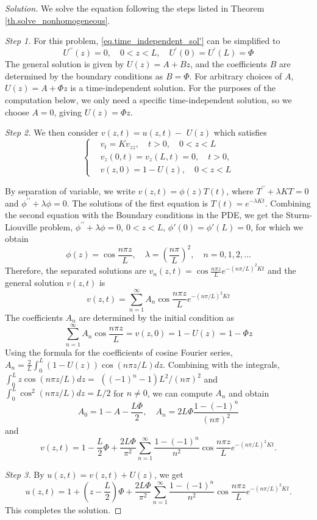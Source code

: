 \begin{proof}[Solution] We solve the equation following the steps listed in Theorem \ref{th.solve_nonhomogeneous}.

\textit{Step 1.} For this problem, \eqref{eq.time_independent_sol'} can be simplified to 
$$
U^{\prime \prime}(z)=0, \quad 0<z<L, \quad U^{\prime}(0)=U^{\prime}(L)=\Phi
$$
The general solution is given by $U(z)=A+Bz$, and the coefficients $B$ are determined by the boundary conditions as $B=\Phi$. For arbitrary choices of $A$, $U(z)=A+\Phi z$ is a time-independent solution. For the purposes of the computation below, we only need a specific time-independent solution, so we choose $A = 0$, giving $U(z)=\Phi z$.

\textit{Step 2.} We then consider $v(z, t)=u(z, t)-$ $U(z)$ which satisfies
$$
    \left\{\begin{aligned}
        & v_t=K v_{z z}, \quad t>0, \quad 0<z<L 
        \\
        &v_z(0, t)=v_z(L, t)=0, \quad t>0, 
        \\
        &v(z, 0)=1-U(z), \quad 0<z<L
        \end{aligned}\right.
    $$

By separation of variable, we write $v(z, t)=\phi(z) T(t)$, where $T^{\prime \prime}+\lambda K T=0$ and $\phi^{\prime \prime}+\lambda \phi=0$. The solutions of the first equation is $T(t)=e^{-\lambda K t}$. Combining the second equation with the Boundary conditions in the PDE, we get the Sturm-Liouville problem, $\phi^{\prime \prime}+\lambda \phi=0$, $0<z<L$, $\phi'(0)=\phi'(L)=0$, for which we obtain
    $$
    \phi(z)=\cos \frac{n \pi z}{L}, \quad \lambda=\left(\frac{n \pi}{L}\right)^2, \quad n=0,1,2, \ldots
    $$
Therefore, the separated solutions are $v_n(z, t)=\cos \frac{n \pi z}{L} e^{-(n \pi / L)^2 K t}$ and the general solution $v(z, t)$ is
    $$
    v(z, t)=\sum_{n=1}^{\infty} A_n \cos \frac{n \pi z}{L} e^{-(n \pi / L)^2 K t}
    $$
The coefficients $A_n$ are determined by the initial condition as    
    $$
    \sum_{n=1}^{\infty} A_n \cos \frac{n \pi z}{L} = v(z, 0)=1-U(z)=1-\Phi z
    $$
    Using the formula for the coefficients of cosine Fourier series, $A_n = \frac{2}{L}\int_0^L (1-U(z))\cos (n \pi z / L) d z$. Combining with the integrals, $\int_0^L z \cos (n \pi z / L) d z=$ $\left((-1)^n-1\right) L^2 /(n \pi)^2$ and $ \int_0^L \cos ^2(n \pi z / L) d z=L / 2$ for $n \neq 0$, we can compute $A_n$ and obtain
    $$
    A_0=1-A-\frac{L \Phi}{2}, \quad A_n=2 L \Phi \frac{1-(-1)^n}{(n \pi)^2}
    $$
and
    $$
    v(z, t)=1-\frac{L}{2}\Phi+\frac{2 L \Phi}{\pi^2} \sum_{n=1}^{\infty} \frac{1-(-1)^n}{n^2} \cos \frac{n \pi z}{L} e^{-(n \pi / L)^2 K t}.
    $$


\textit{Step 3.} By $u(z, t) = v(z, t) + U(z)$, we get
    $$
    u(z, t)=1+\left(z-\frac{L}{2}\right) \Phi+\frac{2 L \Phi}{\pi^2} \sum_{n=1}^{\infty} \frac{1-(-1)^n}{n^2} \cos \frac{n \pi z}{L} e^{-(n \pi / L)^2 K t}.
    $$       
This completes the solution.
\end{proof}

